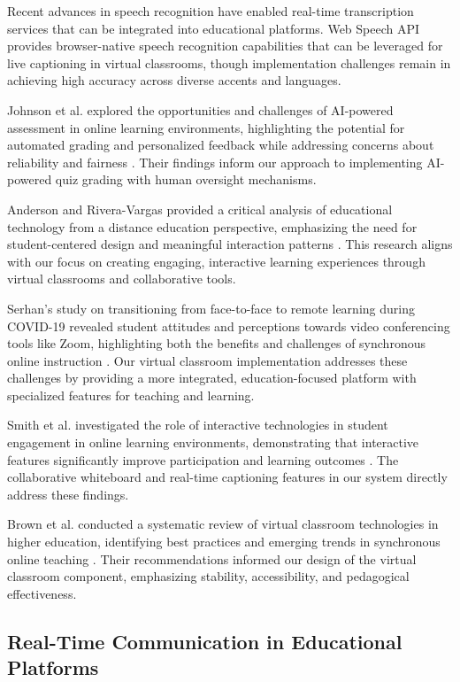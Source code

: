 \documentclass[onecolumn]{IEEEtran}
\begin{document}
Recent advances in speech recognition have enabled real-time transcription services that can be integrated into educational platforms. Web Speech API provides browser-native speech recognition capabilities that can be leveraged for live captioning in virtual classrooms, though implementation challenges remain in achieving high accuracy across diverse accents and languages.

Johnson et al. explored the opportunities and challenges of AI-powered assessment in online learning environments, highlighting the potential for automated grading and personalized feedback while addressing concerns about reliability and fairness \cite{johnson2023}. Their findings inform our approach to implementing AI-powered quiz grading with human oversight mechanisms.

Anderson and Rivera-Vargas provided a critical analysis of educational technology from a distance education perspective, emphasizing the need for student-centered design and meaningful interaction patterns \cite{anderson2021}. This research aligns with our focus on creating engaging, interactive learning experiences through virtual classrooms and collaborative tools.

Serhan's study on transitioning from face-to-face to remote learning during COVID-19 revealed student attitudes and perceptions towards video conferencing tools like Zoom, highlighting both the benefits and challenges of synchronous online instruction \cite{serhan2020}. Our virtual classroom implementation addresses these challenges by providing a more integrated, education-focused platform with specialized features for teaching and learning.

Smith et al. investigated the role of interactive technologies in student engagement in online learning environments, demonstrating that interactive features significantly improve participation and learning outcomes \cite{smith2021}. The collaborative whiteboard and real-time captioning features in our system directly address these findings.

Brown et al. conducted a systematic review of virtual classroom technologies in higher education, identifying best practices and emerging trends in synchronous online teaching \cite{brown2021}. Their recommendations informed our design of the virtual classroom component, emphasizing stability, accessibility, and pedagogical effectiveness.

\subsection{Real-Time Communication in Educational Platforms}
\end{document}

